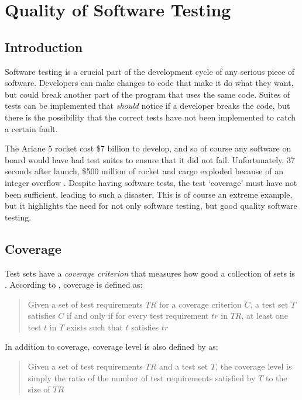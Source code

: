 \section{Quality of Software Testing}
\subsection{Introduction}
Software testing is a crucial part of the development cycle of any serious piece of software. Developers can make changes to code that make it do what they want, but could break another part of the program that uses the same code. Suites of tests can be implemented that \emph{should} notice if a developer breaks the code, but there is the possibility that the correct tests have not been implemented to catch a certain fault.

The Ariane 5 rocket cost \$7 billion to develop, and so of course any software on board would have had test suites to ensure that it did not fail. Unfortunately, 37 seconds after launch, \$500 million of rocket and cargo exploded because of an integer overflow \citep{ariane5}. Despite having software tests, the test `coverage' must have not been sufficient, leading to such a disaster. This is of course an extreme example, but it highlights the need for not only software testing, but good quality software testing.


\subsection{Coverage}

Test sets have a \emph{coverage criterion} that measures how good a collection of sets is \citep{softwareTestingIntro}. According to \citet{softwareTestingIntro}, coverage is defined as:

\begin{quote} Given a set of test requirements $TR$ for a coverage criterion $C$, a test set $T$ satisfies $C$ if and only if for every test requirement $tr$ in $TR$, at least one test $t$ in $T$ exists such that $t$ satisfies $tr$ \end{quote}

In addition to coverage, coverage level is also defined by \citep{softwareTestingIntro} as:

\begin{quote}Given a set of test requirements $TR$ and a test set $T$, the coverage level is simply the ratio of the number of test requirements satisfied by $T$ to the size of $TR$\end{quote}

